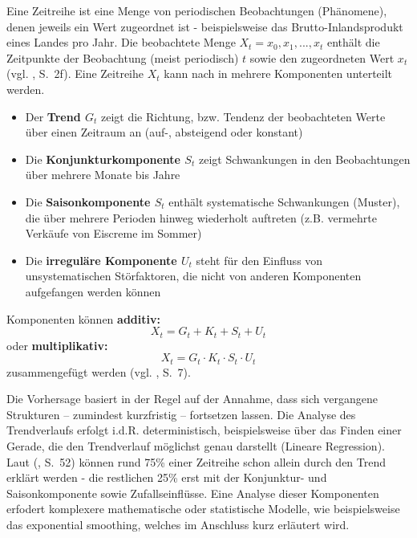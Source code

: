 Eine Zeitreihe ist eine Menge von periodischen Beobachtungen (Phänomene), denen jeweils ein Wert zugeordnet ist - beispielsweise das Brutto-Inlandsprodukt eines Landes pro Jahr. Die beobachtete Menge $X_t=x_0, x_1,...,x_t$ enthält die Zeitpunkte der Beobachtung (meist periodisch) $t$ sowie den zugeordneten Wert $x_t$ (vgl. \citeauthor{leiner1998} \citeyear{leiner1998}, S.~2f).
Eine Zeitreihe $X_t$ kann nach \cite{leiner1998} in mehrere Komponenten unterteilt werden.
\begin{itemize}
    \item Der \textbf{Trend $G_t$} zeigt die Richtung, bzw. Tendenz der beobachteten Werte über einen Zeitraum an (auf-, absteigend oder konstant)
    \item Die \textbf{Konjunkturkomponente $S_t$} zeigt Schwankungen in den Beobachtungen über mehrere Monate bis Jahre
    \item Die \textbf{Saisonkomponente $S_t$} enthält systematische Schwankungen (Muster), die über mehrere Perioden hinweg wiederholt auftreten (z.B. vermehrte Verkäufe von Eiscreme im Sommer)
    \item Die \textbf{irreguläre Komponente $U_t$} steht für den Einfluss von unsystematischen Störfaktoren, die nicht von anderen Komponenten aufgefangen werden können
\end{itemize}

Komponenten können \textbf{additiv:}
\begin{equation}
    X_t=G_t+K_t+S_t+U_t
\end{equation}
oder \textbf{multiplikativ:}
\begin{equation}
    X_t=G_t\cdot K_t \cdot S_t \cdot U_t
\end{equation}
zusammengefügt werden (vgl. \citeauthor{leiner1998} \citeyear{leiner1998}, S.~7).

Die Vorhersage basiert in der Regel auf der Annahme, dass sich vergangene Strukturen – zumindest kurzfristig – fortsetzen lassen. Die Analyse des Trendverlaufs erfolgt i.d.R. deterministisch, beispielsweise über das Finden einer Gerade, die den Trendverlauf möglichst genau darstellt (Lineare Regression). Laut \citeauthor{leiner1998} (\citeyear{leiner1998}, S.~52) können rund 75\% einer Zeitreihe schon allein durch den Trend erklärt werden - die restlichen 25\% erst mit der Konjunktur- und Saisonkomponente sowie Zufallseinflüsse. Eine Analyse dieser Komponenten erfodert komplexere mathematische oder statistische Modelle, wie beispielsweise das exponential smoothing, welches im Anschluss kurz erläutert wird.

